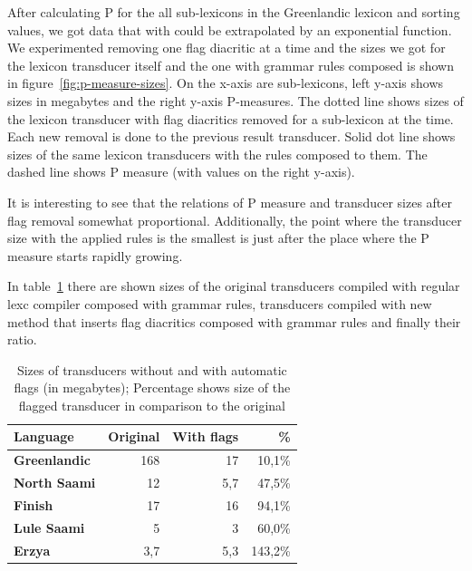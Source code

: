\documentclass[10pt, a4paper]{article}
\begin{document}
After calculating P for the all sub-lexicons in the Greenlandic lexicon and sorting values, we got data 
that with could be extrapolated by an exponential function. We experimented removing one flag diacritic at a 
time and the sizes we got for the lexicon transducer itself and the one with grammar rules composed is shown in 
figure~\ref{fig:p-measure-sizes}. On the x-axis are sub-lexicons, left y-axis shows sizes in megabytes and the right 
y-axis P-measures. The dotted line shows sizes of the lexicon transducer with flag diacritics removed for 
a sub-lexicon at the time. Each new removal is done to the previous result transducer. Solid dot line shows sizes of the same lexicon transducers with the rules composed to them. 
The dashed line shows P measure (with values on the right y-axis).  
  
It is interesting to see that the relations of P measure and transducer sizes after flag removal somewhat proportional. 
Additionally, the point where the transducer size with the applied rules is the smallest is just after the place where 
the P measure starts rapidly growing. 









In table~\ref{table:sizes} there are shown sizes of the original
transducers compiled with regular lexc compiler composed with grammar rules, transducers compiled
with new method that inserts flag diacritics composed with grammar rules and finally their ratio.

\begin{table}
    \centering
    \begin{tabular}{|l|r|r|r|}
        \hline
        \bf Language & \bf Original & \bf With flags & \bf \% \\
        \hline
        \bf Greenlandic &   168   & 17 & 10,1\%  \\
        \bf North Saami &   12     & 5,7 & 47,5\%  \\
        \bf Finish &   17     & 16 & 94,1\%  \\
        \bf Lule Saami  &   5     & 3 & 60,0\%  \\
        \bf Erzya       &   3,7     & 5,3 & 143,2\%  \\
        \hline
    \end{tabular}
    \caption{Sizes of transducers without and with automatic flags (in megabytes); Percentage shows size of the flagged transducer in comparison to the original
    \label{table:sizes}}
\end{table}
\end{document}
